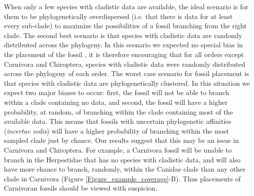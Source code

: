\documentclass[12pt,letterpaper]{article}
\begin{document}
When only a few species with cladistic data are available, the ideal scenario is for them to be phylogenetically overdispersed (i.e. that there is data for at least every sub-clade) to maximize the possibilities of a fossil branching from the right clade.
The second best scenario is that species with cladistic data are randomly distributed across the phylogeny. 
In this scenario we expected no special bias in the placement of the fossil \citep{GuillermeCooper}, it is therefore encouraging that for all orders except Carnivora and Chiroptera, species with cladistic data were randomly distributed across the phylogeny of each order.
The worst case scenario for fossil placement is that species with cladistic data are phylogenetically clustered. 
In this situation we expect two major biases to occur: first, the fossil will not be able to branch within a clade containing no data, and second, the fossil will have a higher probability, at random, of branching within the clade containing most of the available data.
This means that fossils with uncertain phylogenetic affinities (\textit{incertae sedis}) will have a higher probability of branching within the most sampled clade just by chance.
Our results suggest that this may be an issue in Carnivora and Chiroptera. 
For example, a Carnivora fossil will be unable to branch in the Herpestidae that has no species with cladistic data, and will also have more chance to branch, randomly, within the Canidae clade than any other clade in Carnivora (Figure \ref{Figure_example_coverage}-B).
Thus placements of Carnivoran fossils should be viewed with suspicion. %
\end{document}

